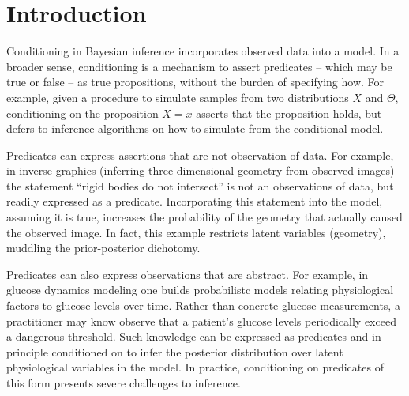 
\section{Introduction}

Conditioning in Bayesian inference incorporates observed data into a model.
In a broader sense, conditioning is a mechanism to assert predicates -- which may be true or false -- as true propositions, without the burden of specifying how.
For example, given a procedure to simulate samples from two distributions $X$ and $\Theta$, conditioning on the proposition $X = x$ asserts that the proposition holds, but defers to inference algorithms on how to simulate from the conditional model.

Predicates can express assertions that are not observation of data.
For example, in inverse graphics \cite{kulkarni2015deep} (inferring three dimensional geometry from observed images) the statement ``rigid bodies do not intersect'' is not an observations of data, but readily expressed as a predicate.
Incorporating this statement into the model, assuming it is true, increases the probability of the geometry that actually caused the observed image.
In fact, this example restricts latent variables (geometry), muddling the prior-posterior dichotomy.

Predicates can also express observations that are abstract.
For example, in glucose dynamics modeling \citep{levine2017offline} one builds probabilistc models relating physiological factors to glucose levels over time.
Rather than concrete glucose measurements, a practitioner may know observe that a patient's glucose levels periodically exceed a dangerous threshold.
Such knowledge can be expressed as predicates and in principle conditioned on to infer the posterior distribution over latent physiological variables in the model.
In practice, conditioning on predicates of this form presents severe challenges to inference.



